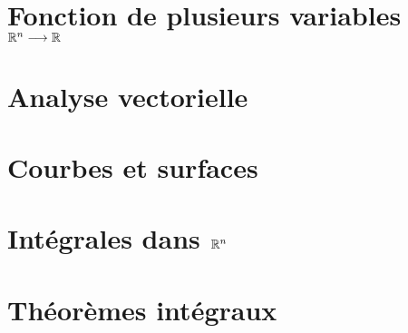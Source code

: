 \section{Fonction de plusieurs variables $\mathbb{R}^n\longrightarrow\mathbb{R}$}


\section{Analyse vectorielle}


\section{Courbes et surfaces}


\section{Intégrales dans $\mathbb{R}^n$}


\section{Théorèmes intégraux}
